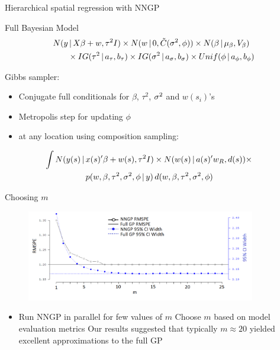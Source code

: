 \begin{frame}{Hierarchical spatial regression with NNGP}
\vskip 2mm \begin{alertblock}{Full Bayesian Model}
		\begin{align*}
		N(y &\,|\, X\beta +w, \tau^2I) \times N(w\,|\, 0,\tilde C(\sigma^2, \phi)) \times N(\beta \,|\, \mu_\beta,V_\beta)\\
		& \times IG(\tau^2 \,|\, a_\tau,b_\tau) \times IG(\sigma^2 \,|\, a_\sigma,b_\sigma) \times Unif(\phi \,|\, a_\phi, b_\phi)
		\end{align*} 
\end{alertblock}
Gibbs sampler:
	\begin{itemize}
		\item Conjugate full conditionals for $\beta$, $\tau^2$, $\sigma^2$ and $w(s_i)$'s 
		\item Metropolis step for updating $\phi$
		\item {} at any location using composition sampling:
		\begin{small}
		\begin{align*}
		\hskip -1cm  \int N(y(s) \given &x(s)'\beta + w(s), \tau^2I) \times N(w(s) \given a(s)'w_{R}, d(s)) \times \\
		&p(w, \beta, \taus, \sigs, \phi \given y) \, d(w,\beta, \taus, \sigs, \phi)
		\end{align*} 
		\end{small}
	\end{itemize}
\end{frame}

\begin{frame}{Choosing $m$}
	\begin{figure}[t!]
		\begin{center}
			\includegraphics[width=10cm]{../figures/nn-pred.png}\label{uni-nn-pred}
		\end{center}
	\end{figure}
	
	\begin{itemize}
		\item Run NNGP in parallel for few values of $m$
		\myitem Choose $m$ based on model evaluation metrics
		\myitem Our results suggested that typically $m \approx 20$ yielded excellent approximations to the full GP
	\end{itemize}
\end{frame}

